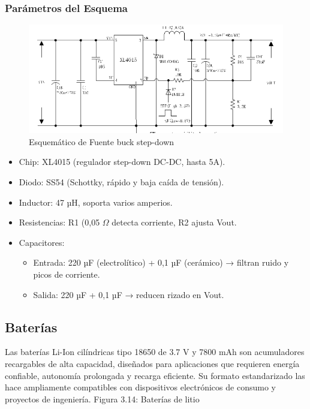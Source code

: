 \documentclass[12pt,a4paper]{article}
\begin{document}
\subsubsection{Parámetros del Esquema}

\begin{figure}
\includegraphics[width=0.9\linewidth]{Carpeta tecnica/esquemastepdown.png}
\caption{Esquemático de Fuente buck step-down}
\end{figure}

\begin{itemize}
\item Chip: XL4015 (regulador step-down DC-DC, hasta 5A).

\item Diodo: SS54 (Schottky, rápido y baja caída de tensión).

\item Inductor: 47 µH, soporta varios amperios.

\item Resistencias: R1 (0,05 $\Omega$ detecta corriente, R2 ajusta Vout.

\item Capacitores:

\begin{itemize}


\item Entrada: 220 µF (electrolítico) + 0,1 µF (cerámico) → filtran ruido y picos de corriente.

\item Salida: 220 µF + 0,1 µF → reducen rizado en Vout.

\end{itemize}
\end{itemize}

\subsection{Baterías}
Las baterías Li-Ion cilíndricas tipo 18650 de 3.7 V y 7800 mAh son acumuladores
recargables de alta capacidad, diseñados para aplicaciones que requieren energía confiable,
autonomía prolongada y recarga eficiente. Su formato estandarizado las hace ampliamente
compatibles con dispositivos electrónicos de consumo y proyectos de ingeniería.
Figura 3.14: Baterías de litio
\end{document}
